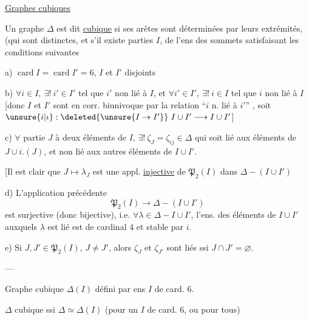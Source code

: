 \uline{Graphes cubiques}

Un graphe $\Delta$ est dit  \uline{cubique} si  ses arêtes sont déterminées par leurs extrémités, (qui sont distinctes, et s'il existe  parties $I$,  de l'ens des sommets satisfaisant les conditions suivantes

a)  $\operatorname{card} I=\operatorname{card} I'=6$, $I$ et $I'$ disjoints

b) $\forall i\in I,\ \exists!\ i'\in I'$ tel que $i'$ non lié à $I$, et $\forall i'\in I',\ \exists!\ i\in I$ tel que $i$ non lié à $I$ [donc $I$ et $I'$ sont en corr. biunivoque par la relation ``$i$ n. lié à $i'$'' , soit $\unsure{i|\iota}:\deleted{\unsure{I\to I'}}\ I\cup I'\longrightarrow I\cup I'$] 

c) $\forall$ partie $J$  à deux éléments de $I$, $\exists!\ \zeta_J=\zeta_{ij}\in\Delta$  qui soit lié aux  éléments  de $J\cup i.(J)$, et non lié aux autres éléments de $I\cup I'$.

\deleted{[\unsure{donc c'est donc que} $\lambda_J\notin I\cup I'$}

[Il est clair que $J\longmapsto\lambda_J$ est une appl. \uline{injective} de $\mathfrak P_2(I)$ dans $\Delta-(I\cup I')$

d) L'application précédente
\[
\mathfrak P_2(I)\longrightarrow\Delta-(I\cup I')
\]
est  surjective (donc bijective), i.e. $\forall\lambda\in\Delta-I\cup I'$,  l'ens. des éléments de $I\cup I'$ auxquels $\lambda$ est lié est de cardinal $4$ et stable par $i$.

e) Si $J,J'\in\mathfrak P_2(I)$, $J\ne J'$, alors $\zeta_J$ et $\zeta_{J'}$ sont liés ssi $J\cap J'=\varnothing$.

\centerline{---}

Graphe cubique $\Delta(I)$ défini par ens $I$ de card. $6$.

$\Delta$ cubique ssi $\Delta\simeq\Delta(I)$ (pour un $I$ de card. $6$, ou pour tous)
